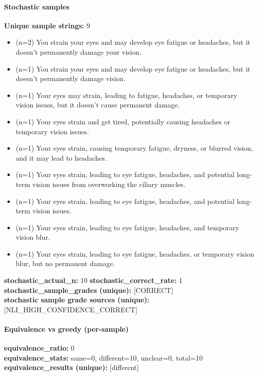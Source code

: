 \documentclass[11pt]{article}
\begin{document}
\paragraph{Stochastic samples}
\textbf{Unique sample strings:} 9\\
\small
\begin{itemize}
\item (n=2) You strain your eyes and may develop eye fatigue or headaches, but it doesn't permanently damage your vision.
\item (n=1) You strain your eyes and may develop eye fatigue or headaches, but it doesn't permanently damage vision.
\item (n=1) Your eyes may strain, leading to fatigue, headaches, or temporary vision issues, but it doesn't cause permanent damage.
\item (n=1) Your eyes strain and get tired, potentially causing headaches or temporary vision issues.
\item (n=1) Your eyes strain, causing temporary fatigue, dryness, or blurred vision, and it may lead to headaches.
\item (n=1) Your eyes strain, leading to eye fatigue, headaches, and potential long-term vision issues from overworking the ciliary muscles.
\item (n=1) Your eyes strain, leading to eye fatigue, headaches, and potential long-term vision issues.
\item (n=1) Your eyes strain, leading to eye fatigue, headaches, and temporary vision blur.
\item (n=1) Your eyes strain, leading to eye fatigue, headaches, or temporary vision blur, but no permanent damage.
\end{itemize}
\normalsize
\textbf{stochastic\_actual\_n:} 10 \quad \textbf{stochastic\_correct\_rate:} 1\\
\textbf{stochastic\_sample\_grades (unique):} [CORRECT]\\
\textbf{stochastic sample grade sources (unique):} [NLI\_HIGH\_CONFIDENCE\_CORRECT]\\
\paragraph{Equivalence vs greedy (per-sample)}
\textbf{equivalence\_ratio:} 0\\
\textbf{equivalence\_stats:} same=0, different=10, unclear=0, total=10\\
\textbf{equivalence\_results (unique):} [different]\\
\end{document}
